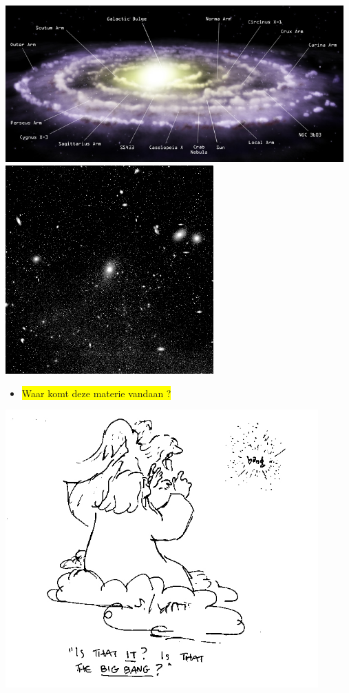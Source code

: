 \vspace*{1mm}
\begin{center}
\includegraphics[keepaspectratio,width=13cm]{milky-way}\\[3mm]
\includegraphics[keepaspectratio,height=8cm]{virgo}
\end{center}

\Tr
\vspace*{1mm}
\begin{itemize}
\item \colorbox{yellow}{Waar komt deze materie vandaan ?}
\end{itemize}
%
\vspace*{1cm}
\includegraphics[keepaspectratio,width=12cm]{bang}

